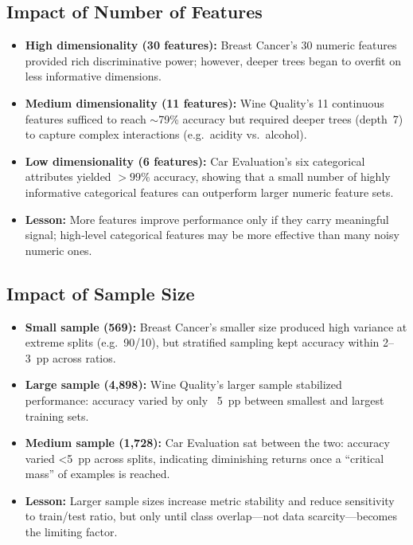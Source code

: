 \subsection{Impact of Number of Features}
\begin{itemize}
	\item \textbf{High dimensionality (30 features):}
	      Breast Cancer’s 30 numeric features provided rich discriminative power; however, deeper trees began to overfit on less informative dimensions.
	\item \textbf{Medium dimensionality (11 features):}
	      Wine Quality’s 11 continuous features sufficed to reach $\sim$79\% accuracy but required deeper trees (depth 7) to capture complex interactions (e.g.\ acidity vs.\ alcohol).
	\item \textbf{Low dimensionality (6 features):}
	      Car Evaluation’s six categorical attributes yielded \(>99\%\) accuracy, showing that a small number of highly informative categorical features can outperform larger numeric feature sets.
	\item \textbf{Lesson:}
	      More features improve performance only if they carry meaningful signal; high‑level categorical features may be more effective than many noisy numeric ones.
\end{itemize}

\subsection{Impact of Sample Size}
\begin{itemize}
	\item \textbf{Small sample (569):}
	      Breast Cancer’s smaller size produced high variance at extreme splits (e.g.\ 90/10), but stratified sampling kept accuracy within 2–3 pp across ratios.
	\item \textbf{Large sample (4,898):}
	      Wine Quality’s larger sample stabilized performance: accuracy varied by only ~5 pp between smallest and largest training sets.
	\item \textbf{Medium sample (1,728):}
	      Car Evaluation sat between the two: accuracy varied <5 pp across splits, indicating diminishing returns once a “critical mass” of examples is reached.
	\item \textbf{Lesson:}
	      Larger sample sizes increase metric stability and reduce sensitivity to train/test ratio, but only until class overlap—not data scarcity—becomes the limiting factor.
\end{itemize}

